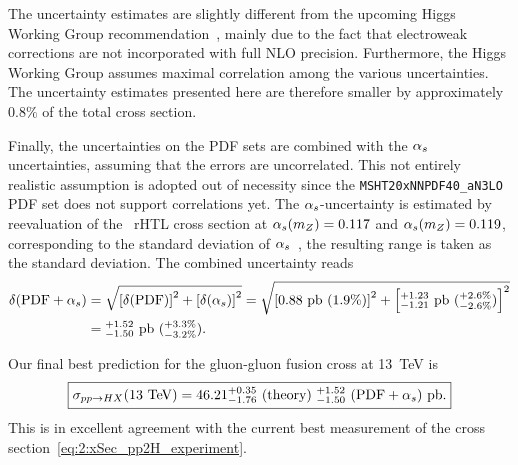 The uncertainty estimates are slightly different from the upcoming Higgs Working Group recommendation~\cite{Cappati:2024}, mainly due to the fact that electroweak corrections are not incorporated with full \acs{NLO} precision. Furthermore, the Higgs Working Group assumes maximal correlation among the various uncertainties. The uncertainty estimates presented here are therefore smaller by approximately $0.8\%$ of the total cross section.

Finally, the uncertainties on the \acs{PDF} sets are combined with the $\alpha_s$ uncertainties, assuming that the errors are uncorrelated. This not entirely realistic assumption is adopted out of necessity since the \texttt{MSHT20xNNPDF40\_aN3LO} \acs{PDF} set does not support correlations yet. The $\alpha_s$-uncertainty is estimated by reevaluation of the \NNNLO\ \acs{rHTL} cross section at $\alpha_s (m_Z) = 0.117$ and $\alpha_s (m_Z) = 0.119$, corresponding to the standard deviation of $\alpha_s$~\cite{ParticleDataGroup:2022pth}, the resulting range is taken as the standard deviation. The combined uncertainty reads
\begin{equation}
\begin{split}
\delta (\text{PDF} + \alpha_s) &= \sqrt{\left[\delta (\text{PDF}) \right]^2 + \left[\delta (\alpha_s)\right]^2} = \sqrt{\left[0.88\ \text{pb}\ (1.9\%) \right]^2 + \left[{}^{+1.23}_{-1.21} \ \text{pb}\ ({}^{+2.6\%}_{-2.6\%}) \right]^2} \\
&= {}^{+1.52}_{-1.50}\ \text{pb} \ ({}^{+3.3\%}_{-3.2\%}).
\end{split}
\end{equation}

Our final best prediction for the gluon-gluon fusion cross at 13~TeV is
\begin{equation}
\boxed{\sigma_{pp \rightarrow HX} (13 \ \mathrm{TeV}) =  46.21^{+0.35}_{-1.76}\ (\text{theory})\ {}^{+1.52}_{-1.50}\ (\text{PDF} + \alpha_s) \ \text{pb}. }
\end{equation}
This is in excellent agreement with the current best measurement of the cross section~\eqref{eq:2:xSec_pp2H_experiment}.




